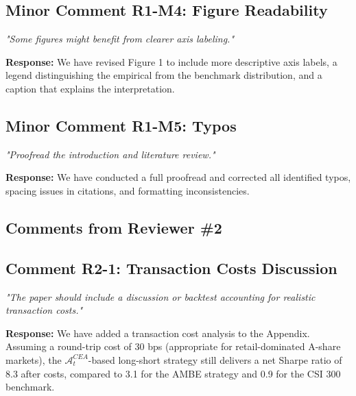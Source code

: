 \documentclass[12pt]{article}
\begin{document}
\subsection*{Minor Comment R1-M4: Figure Readability}
\textit{"Some figures might benefit from clearer axis labeling."}

\begin{highlightbox}
\textbf{Response:} We have revised Figure 1 to include more descriptive axis labels, a legend distinguishing the empirical from the benchmark distribution, and a caption that explains the interpretation.
\end{highlightbox}

\subsection*{Minor Comment R1-M5: Typos}
\textit{"Proofread the introduction and literature review."}

\begin{highlightbox}
\textbf{Response:} We have conducted a full proofread and corrected all identified typos, spacing issues in citations, and formatting inconsistencies.
\end{highlightbox}

\subsection*{Comments from Reviewer \#2}

\subsection*{Comment R2-1: Transaction Costs Discussion}
\textit{"The paper should include a discussion or backtest accounting for realistic transaction costs."}

\begin{highlightbox}
\textbf{Response:} We have added a transaction cost analysis to the Appendix. Assuming a round-trip cost of 30 bps (appropriate for retail-dominated A-share markets), the $\mathcal{A}^{CEA}_t$-based long-short strategy still delivers a net Sharpe ratio of 8.3 after costs, compared to 3.1 for the AMBE strategy and 0.9 for the CSI 300 benchmark.
\end{highlightbox}
\end{document}
